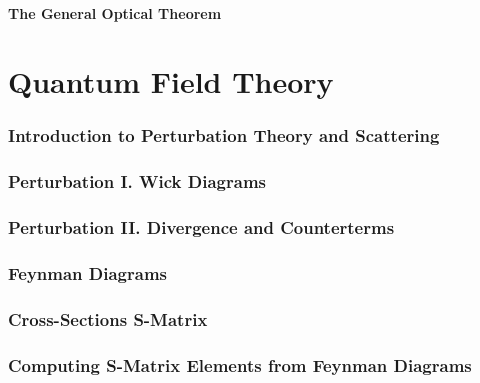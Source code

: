 \documentclass[12pt]{article}
\numberwithin{equation}{section}
\begin{document}
\subsection{The General Optical Theorem}
\part{Quantum Field Theory}
\section{Introduction to Perturbation Theory and Scattering} 
\section{Perturbation I. Wick Diagrams}
\section{Perturbation II. Divergence and Counterterms}
\section{Feynman Diagrams}
\section{Cross-Sections S-Matrix}
\section{Computing S-Matrix Elements from Feynman Diagrams}
\end{document}
